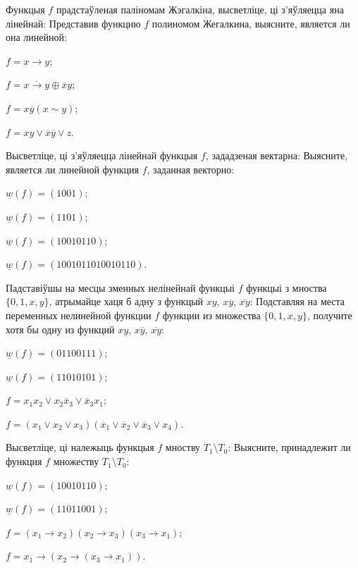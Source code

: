 \documentclass[12pt, a4paper]{article}
\begin{document}
\begin{problemList}
\problemItemWithCommonPart
{Функцыя $f$ прадстаўленая паліномам Жэгалкіна, высветліце, ці з'яўляецца яна лінейнай:}
{Представив функцию $f$ полиномом Жегалкина, выясните, является ли она линейной:}
{%
\begin{belarusianEnumerateMulticol}
    \item $f=x\rightarrow y$;
    \item $f=\overline{x\rightarrow y}\oplus\overline{x}y$;
    \item $f=x\overline{y}(x\sim y)$;
    \item $f=xy\vee\overline{x}\overline{y}\vee z$.
\end{belarusianEnumerateMulticol}
}

\problemItemWithCommonPart
{Высветліце, ці з'яўляецца лінейнай функцыя $f$, зададзеная вектарна:}
{Выясните, является ли линейной функция $f$, заданная векторно:}
{%
\begin{belarusianEnumerateMulticol}
    \item $\underline{w}(f)=(1001)$;
    \item $\underline{w}(f)=(1101)$;
    \item $\underline{w}(f)=(10010110)$;
    \item $\underline{w}(f)=(1001011010010110)$.
\end{belarusianEnumerateMulticol}
}

\smallskip

\problemItemWithCommonPart
{Падставіўшы на месцы зменных нелінейнай функцыі $f$ функцыі з мноства $\{0, 1, x, y\}$,
атрымайце хаця б адну з функцый $xy$, $x\overline{y}$, $\overline{xy}$:}
{Подставляя на места переменных нелинейной функции $f$ функции из множества $\{0, 1, x, y\}$,
получите хотя бы одну из функций $xy$, $x\overline{y}$, $\overline{xy}$:}
{%
\begin{belarusianEnumerateMulticol}
    \item $\underline{w}(f)=(01100111)$;
    \item $\underline{w}(f)=(11010101)$;
    \item $f=x_1x_2\vee x_2\overline{x}_3\vee \overline{x}_3x_1$;
    \item $f=(x_1\vee x_2\vee x_3)(\overline{x}_1\vee \overline{x}_2\vee \overline{x}_3\vee x_4)$.
\end{belarusianEnumerateMulticol}
}

\smallskip

\problemItemWithCommonPart
{Высветліце, ці належыць функцыя $f$ мноству $T_1\setminus T_0$:}
{Выясните, принадлежит ли функция $f$ множеству $T_1\setminus T_0$:}
{%
\begin{belarusianEnumerateMulticol}
    \item $\underline{w}(f)=(10010110)$;
    \item $\underline{w}(f)=(11011001)$;
    \item $f=(x_1\rightarrow x_2)(x_2\rightarrow x_3)(x_3 \rightarrow x_1)$;
    \item $f=x_1\rightarrow (x_2 \rightarrow (x_3 \rightarrow x_1))$.
\end{belarusianEnumerateMulticol}
}


\end{problemList}
\end{document}
